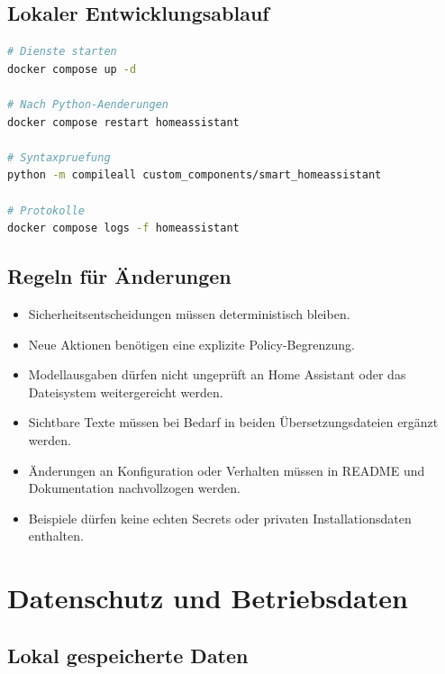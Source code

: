 \documentclass[
  11pt,
  a4paper,
  oneside,
  parskip=half
]{scrreprt}
\begin{document}
\section{Lokaler Entwicklungsablauf}

\begin{lstlisting}[language=bash]
# Dienste starten
docker compose up -d

# Nach Python-Aenderungen
docker compose restart homeassistant

# Syntaxpruefung
python -m compileall custom_components/smart_homeassistant

# Protokolle
docker compose logs -f homeassistant
\end{lstlisting}

\section{Regeln für Änderungen}

\begin{itemize}
  \item Sicherheitsentscheidungen müssen deterministisch bleiben.
  \item Neue Aktionen benötigen eine explizite Policy-Begrenzung.
  \item Modellausgaben dürfen nicht ungeprüft an Home Assistant oder das Dateisystem
        weitergereicht werden.
  \item Sichtbare Texte müssen bei Bedarf in beiden Übersetzungsdateien ergänzt werden.
  \item Änderungen an Konfiguration oder Verhalten müssen in README und Dokumentation
        nachvollzogen werden.
  \item Beispiele dürfen keine echten Secrets oder privaten Installationsdaten enthalten.
\end{itemize}

\chapter{Datenschutz und Betriebsdaten}

\section{Lokal gespeicherte Daten}
\end{document}
